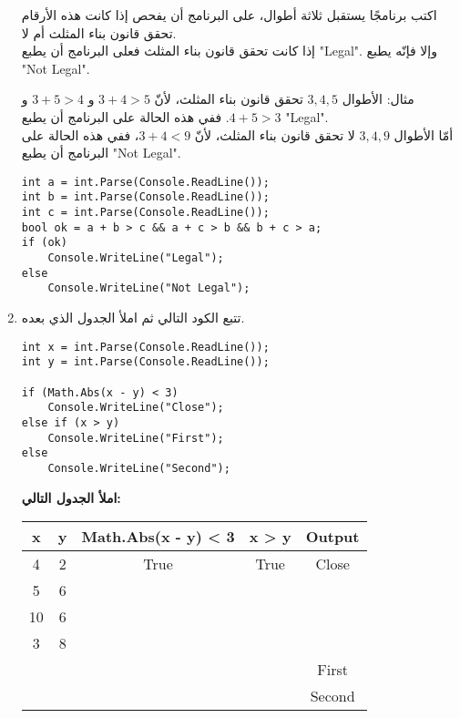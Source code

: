 \documentclass[12pt]{article}
\begin{document}
\begin{enumerate}[itemsep=2em]
اكتب برنامجًا يستقبل ثلاثة أطوال، على البرنامج أن يفحص إذا كانت هذه الأرقام تحقق قانون بناء المثلث أم لا. \\
إذا كانت تحقق قانون بناء المثلث فعلى البرنامج أن يطبع \textenglish{"Legal"}.
وإلا فإنّه يطبع \textenglish{"Not Legal"}.

مثال: الأطوال $3, 4, 5$ تحقق قانون بناء المثلث، لأنّ $3 + 4 > 5$ و $3 + 5 > 4$ و $4 + 5 > 3$. ففي هذه الحالة على البرنامج أن يطبع \textenglish{"Legal"}. \\
أمّا الأطوال $3, 4, 9$ لا تحقق قانون بناء المثلث، لأنّ $3 + 4 < 9$، ففي هذه الحالة على البرنامج أن يطبع \textenglish{"Not Legal"}.


\ifwithsols
\begin{boxSolution}
\begin{english}
\begin{verbatim}
int a = int.Parse(Console.ReadLine());
int b = int.Parse(Console.ReadLine());
int c = int.Parse(Console.ReadLine());
bool ok = a + b > c && a + c > b && b + c > a;
if (ok)
    Console.WriteLine("Legal");
else
    Console.WriteLine("Not Legal");
\end{verbatim}
\end{english}
\end{boxSolution}
\fi

\clearpage
\item
تتبع الكود التالي ثم املأ الجدول الذي بعده.

\begin{boxCode}
\begin{english}
\begin{verbatim}
int x = int.Parse(Console.ReadLine());
int y = int.Parse(Console.ReadLine());

if (Math.Abs(x - y) < 3)
    Console.WriteLine("Close");
else if (x > y)
    Console.WriteLine("First");
else
    Console.WriteLine("Second");
\end{verbatim}
\end{english}
\end{boxCode}

\textbf{املأ الجدول التالي:}
\begin{center}
\begin{tabular}{|c|c|c|c|c|}
\hline
\textbf{x} & \textbf{y} & \textenglish{Math.Abs(x - y) < 3} & \textenglish{x > y} & \textbf{Output} \\
\hline
4 & 2 & True & True & Close \\
\hline
5 & 6 &  &  &  \\
\hline
10 & 6 &  &  &  \\
\hline
3 & 8 &  &  &  \\
\hline
 &  &  &  & First \\
\hline
 &  &  &  & Second \\
\hline
\end{tabular}
\end{center}


\end{enumerate}
\end{document}
